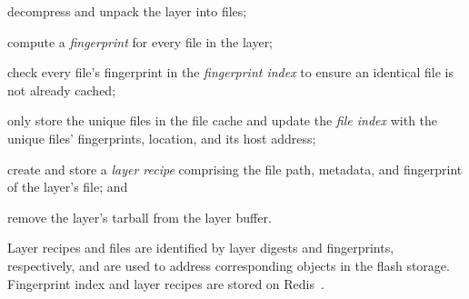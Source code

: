 \begin{compactenumerate}
	\item decompress and unpack the layer into files;
	\item compute a \emph{fingerprint} for every file in the layer;
	\item check every file's fingerprint in the \emph{fingerprint index} to
	ensure an identical file is not already cached;
	\item only store the unique files in the file cache and update the 
	\emph{file index} with the unique files' fingerprints, location, and its host address;
	\item create and store a \emph{layer recipe} comprising the file path,
	metadata, and fingerprint of the layer's file; and
	\item remove the layer's tarball from the layer buffer.
\end{compactenumerate}

Layer recipes and files are identified by layer digests and fingerprints, respectively, and 
are used to address corresponding objects in the flash storage. 
Fingerprint index and layer recipes are stored on Redis~\cite{redis}.

